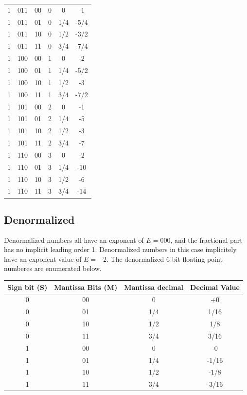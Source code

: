\documentclass{article}
\begin{document}
\begin{tabular}{|c|c|c|c|c|c|}
    1 & 011 & 00 & 0 & 0 & -1 \\
    1 & 011 & 01 & 0 & 1/4 & -5/4 \\
    1 & 011 & 10 & 0 & 1/2 & -3/2 \\
    1 & 011 & 11 & 0 & 3/4 & -7/4 \\
    1 & 100 & 00 & 1 & 0 & -2 \\
    1 & 100 & 01 & 1 & 1/4 & -5/2 \\
    1 & 100 & 10 & 1 & 1/2 & -3 \\
    1 & 100 & 11 & 1 & 3/4 & -7/2 \\
    1 & 101 & 00 & 2 & 0 & -1 \\
    1 & 101 & 01 & 2 & 1/4 & -5 \\
    1 & 101 & 10 & 2 & 1/2 & -3 \\
    1 & 101 & 11 & 2 & 3/4 & -7 \\
    1 & 110 & 00 & 3 & 0 & -2 \\
    1 & 110 & 01 & 3 & 1/4 & -10 \\
    1 & 110 & 10 & 3 & 1/2 & -6 \\
    1 & 110 & 11 & 3 & 3/4 & -14 \\
    \hline
\end{tabular}

\subsection*{Denormalized}

Denormalized numbers all have an exponent of $E=000$, and the fractional part has no implicit leading order 1. Denormalized numbers in this case implicitely have an exponent value of $E=-2$. The denormalized 6-bit floating point numberes are enumerated below. 

\begin{tabular}{|c|c|c|c|}
    \hline
    Sign bit (S) & Mantissa Bits (M) & Mantissa decimal & Decimal Value \\
    \hline
    0 & 00  & 0 & +0 \\
    0 & 01  & 1/4 & 1/16 \\
    0 & 10  & 1/2 & 1/8 \\
    0 & 11  & 3/4 & 3/16 \\
    1 & 00  & 0 & -0 \\
    1 & 01  & 1/4 & -1/16 \\
    1 & 10  & 1/2 & -1/8 \\
    1 & 11  & 3/4 & -3/16 \\
    \hline
\end{tabular}
\end{document}
